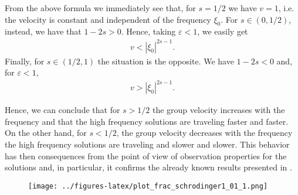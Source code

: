 \documentclass[10pt]{article}
\begin{document}
From the above formula we immediately see that, for $s=1/2$ we have $v=1$, i.e. the velocity is constant and independent of the frequency $\xi_0$. For $s\in(0,1/2)$, instead, we have that $1-2s>0$. Hence, taking $\varepsilon<1$, we easily get
\begin{align*}
	v<|\xi_0|^{2s-1}.
\end{align*}
Finally, for $s\in(1/2,1)$ the situation is the opposite. We have $1-2s<0$ and, for $\varepsilon<1$, 
\begin{align*}
	v>|\xi_0|^{2s-1}.
\end{align*}

Hence, we can conclude that for $s> 1/2$ the group velocity increases with the frequency and that the high frequency solutions are traveling faster and faster. On the other hand, for $s<1/2$, the group velocity decreases with the frequency the high frequency solutions are traveling and slower and slower. This behavior has then consequences from the point of view of observation properties for the solutions and, in particular, it confirms the already known results presented in \cite{biccari2014internal}.

\begin{figure}[h]
	\texttt{[image: ../figures-latex/plot\_frac\_schrodinger1\_01\_1.png]}
\end{figure}


\end{document}
